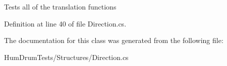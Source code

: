 Tests all of the translation functions 



Definition at line 40 of file Direction.\+cs.



The documentation for this class was generated from the following file\+:\begin{DoxyCompactItemize}
\item 
Hum\+Drum\+Tests/\+Structures/Direction.\+cs\end{DoxyCompactItemize}
